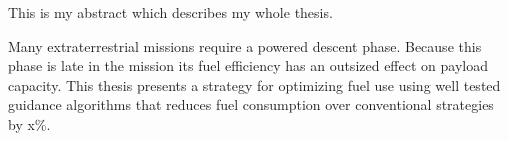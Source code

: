 


This is my abstract which describes my whole thesis. 

Many extraterrestrial missions require a powered descent phase. Because this phase is late in the mission its fuel efficiency has an outsized effect on payload capacity. This thesis presents a strategy for optimizing fuel use using well tested guidance algorithms that reduces fuel consumption over conventional strategies by x\%. 
